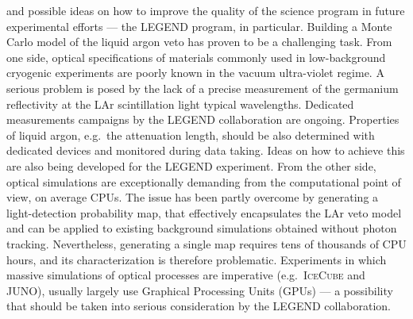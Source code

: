and possible ideas on how to improve the quality of the science program in future
experimental efforts --- the LEGEND program, in particular. Building a Monte Carlo model
of the liquid argon veto has proven to be a challenging task. From one side, optical
specifications of materials commonly used in low-background cryogenic experiments are
poorly known in the vacuum ultra-violet regime. A serious problem is posed by the lack of
a precise measurement of the germanium reflectivity at the LAr scintillation light typical
wavelengths. Dedicated measurements campaigns by the LEGEND collaboration are ongoing.
Properties of liquid argon, e.g.~the attenuation length, should be also determined with
dedicated devices and monitored during data taking. Ideas on how to achieve this are also
being developed for the LEGEND experiment. From the other side, optical simulations are
exceptionally demanding from the computational point of view, on average CPUs. The issue
has been partly overcome by generating a light-detection probability map, that effectively
encapsulates the LAr veto model and can be applied to existing background simulations
obtained without photon tracking. Nevertheless, generating a single map requires tens of
thousands of CPU hours, and its characterization is therefore problematic. Experiments
in which massive simulations of optical processes are imperative (e.g.~\textsc{IceCube}
and JUNO), usually largely use Graphical Processing Units (GPUs) --- a possibility that
should be taken into serious consideration by the LEGEND collaboration.
\newpar


\chapendgliph{}

